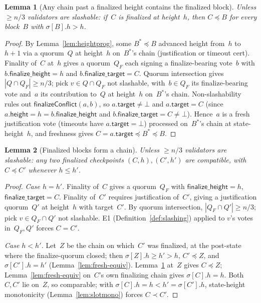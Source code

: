 \documentclass{article}
\newcommand{\target}{\mathsf{target}}
\newcommand{\height}{\mathsf{height}}
\newcommand{\finalizeHeight}{\mathsf{finalize\_height}}
\newcommand{\finalizeTarget}{\mathsf{finalize\_target}}
\newcommand{\finalizeConflict}{\textsf{finalizeConflict}\xspace}
\theoremstyle{plain}
\newtheorem{lemma}{Lemma}
\theoremstyle{definition}
\theoremstyle{remark}
\begin{document}
\begin{lemma}[Any chain past a finalized height contains the finalized block]\label{lem:mainsafety}
Unless $\geq n/3$ validators are slashable: if~$C$ is finalized at height~$h$, then $C \preceq B$ for every block~$B$ with $\sigma[B].h > h$.
\end{lemma}

\begin{proof}
By Lemma~\ref{lem:heightprog}, some $B^* \preceq B$ advanced height from~$h$ to~$h+1$ via a quorum~$Q$ at height~$h$ on~$B^*$'s chain (justification or timeout cert).
Finality of~$C$ at~$h$ gives a quorum~$Q_F$ each signing a finalize-bearing vote~$b$ with $b.\finalizeHeight = h$ and $b.\finalizeTarget = C$.
Quorum intersection gives $|Q \cap Q_F| \geq n/3$; pick $v \in Q \cap Q_F$ not slashable, with~$b \in Q_F$ its finalize-bearing vote and~$a$ its contribution to~$Q$ at height~$h$ on~$B^*$'s chain.
Non-slashability rules out $\finalizeConflict(a, b)$, so $a.\target \neq \bot$ and $a.\target = C$ (since $a.\height = h = b.\finalizeHeight$ and $b.\finalizeTarget = C \neq \bot$).
Hence~$a$ is a fresh justification vote (timeouts have $a.\target = \bot$) processed on~$B^*$'s chain at state-height~$h$, and freshness gives $C = a.\target \preceq B^* \preceq B$.
\end{proof}

\begin{lemma}[Finalized blocks form a chain]\label{lem:finchain}
Unless $\geq n/3$ validators are slashable: any two finalized checkpoints $(C, h), (C', h')$ are compatible, with $C \preceq C'$ whenever $h \leq h'$.
\end{lemma}

\begin{proof}
\emph{Case $h = h'$.}
Finality of~$C$ gives a quorum~$Q_F$ with $\finalizeHeight = h$, $\finalizeTarget = C$.
Finality of~$C'$ requires justification of~$C'$, giving a justification quorum~$Q'$ at height~$h$ with target~$C'$.
By quorum intersection, $|Q_F \cap Q'| \geq n/3$; pick $v \in Q_F \cap Q'$ not slashable.
E1 (Definition~\ref{def:slashing}) applied to $v$'s votes in~$Q_F, Q'$ forces $C = C'$.

\emph{Case $h < h'$.}
Let~$Z$ be the chain on which~$C'$ was finalized, at the post-state where the finalize-quorum closed; then $\sigma[Z].h \geq h' > h$, $C' \preceq Z$, and $\sigma[C'].h = h'$ (Lemma~\ref{lem:fresh-equiv}).
Lemma~\ref{lem:mainsafety} at~$Z$ gives $C \preceq Z$; Lemma~\ref{lem:fresh-equiv} on~$C$'s own finalizing chain gives $\sigma[C].h = h$.
Both~$C, C'$ lie on~$Z$, so comparable; with $\sigma[C].h = h < h' = \sigma[C'].h$, state-height monotonicity (Lemma~\ref{lem:slotmono}) forces $C \prec C'$.
\end{proof}
\end{document}

